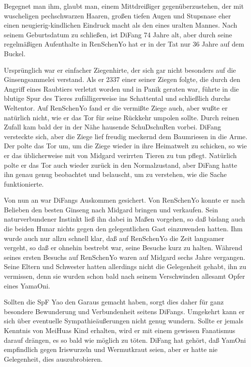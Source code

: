 \documentclass[
a4paper,
twoside,
DIV=calc,
BCOR=4mm,
fontsize=9pt,
twocolumn=on,
titlepage=on,
parskip=half
]{scrartcl}
\begin{document}
Begegnet man ihm, glaubt man, einem Mittdreißiger gegenüberzustehen,
der mit wuscheligen pechschwarzen Haaren, großen tiefen Augen und
Stupsnase eher einen neugierig-kindlichen Eindruck macht als den eines
uralten Mannes. Nach seinem Geburtsdatum zu schließen, ist DiFang 74
Jahre alt, aber durch seine regelmäßigen Aufenthalte in RenSchenYo hat
er in der Tat nur 36 Jahre auf dem Buckel.

Ursprünglich war er einfacher Ziegenhirte, der sich gar nicht
besonders auf die Ginsengsammelei verstand. Als er 2337 einer seiner
Ziegen folgte, die durch den Angriff eines Raubtiers verletzt worden
und in Panik geraten war, führte in die blutige Spur des Tieres
zufälligerweise ins Schattental und schließlich durchs Weltentor. Auf
RenSchenYo fand er die vermißte Ziege auch, aber wußte er natürlich
nicht, wie er das Tor für seine Rückkehr umpolen sollte. Durch reinen
Zufall kam bald der in der Nähe hausende SchuDschuRen vorbei. DiFang
versteckte sich, aber die Ziege lief freudig meckernd dem Baumriesen
in die Arme. Der polte das Tor um, um die Ziege wieder in ihre
Heimatwelt zu schicken, so wie er das üblicherweise mit von Midgard
verirrten Tieren zu tun pflegt. Natürlich polte er das Tor auch wieder
zurück in den Normalzustand, aber DiFang hatte ihn genau genug
beobachtet und belauscht, um zu verstehen, wie die Sache
funktionierte.

Von nun an war DiFangs Auskommen gesichert. Von RenSchenYo konnte er
nach Belieben den besten Ginseng nach Midgard bringen und
verkaufen. Sein naturverbundener Instinkt ließ ihn dabei in Maßen
vorgehen, so daß bislang auch die beiden Hunar nichts gegen den
gelegentlichen Gast einzuwenden hatten. Ihm wurde auch nur allzu
schnell klar, daß auf RenSchenYo die Zeit langsamer vergeht, so daß er
ohnehin bestrebt war, seine Besuche kurz zu halten. Während seines
ersten Besuchs auf RenSchenYo waren auf Midgard sechs Jahre
vergangen. Seine Eltern und Schwester hatten allerdings nicht die
Gelegenheit gehabt, ihn zu vermissen, denn sie wurden schon bald nach
seinem Verschwinden allesamt Opfer eines YamaOni.

Sollten die SpF Yao den Garaus gemacht haben, sorgt dies daher für
ganz besondere Bewunderung und Verbundenheit seitens
DiFangs. Umgekehrt kann er sich über eventuelle Sympathieäußerungen
nicht genug wundern. Sollte er jemals Kenntnis von MeiHuas Kind
erhalten, wird er mit einem gewissen Fanatismus darauf drängen, es so
bald wie möglich zu töten. DiFang hat gehört, daß YamOni empfindlich
gegen Iriswurzeln und Wermutkraut seien, aber er hatte nie
Gelegenheit, dies auszubrobieren.
\end{document}
